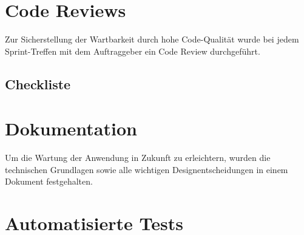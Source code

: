 
%


\clearpage


\section{Code Reviews}

Zur Sicherstellung der Wartbarkeit durch hohe Code-Qualität wurde bei jedem
Sprint-Treffen mit dem Auftraggeber ein Code Review durchgeführt.


\subsection{Checkliste}






\clearpage
\section{Dokumentation}

Um die Wartung der Anwendung in Zukunft zu erleichtern, wurden die technischen Grundlagen
sowie alle wichtigen Designentscheidungen in einem Dokument festgehalten.






\clearpage
\section{Automatisierte Tests}

